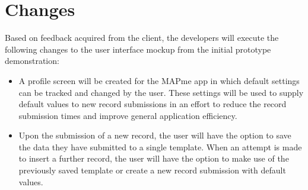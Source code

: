 \documentclass[12pt,a4paper,oneside]{report}
\begin{document}
\section{Changes}
Based on feedback acquired from the client, the developers will execute the following changes to the user interface mockup from the initial prototype demonstration:
\begin{itemize}
	\item A profile screen will be created for the MAPme app in which default settings can be tracked and changed by the user.  These settings will be used to supply default values to new record submissions in an effort to reduce the record submission times and improve general application efficiency.
	\item Upon the submission of a new record, the user will have the option to save the data they have submitted to a single template.  When an attempt is made to insert a further record, the user will have the option to make use of the previously saved template or create a new record submission with default values.
\end{itemize}
\end{document}
